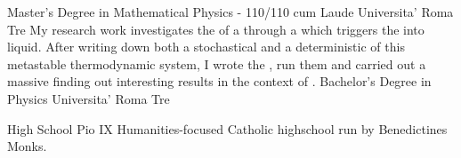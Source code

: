 \documentclass[9pt]{developercv} %
\newcommand{\myHilight}[2]{\tcbtp{\textit{\color{#1}{#2}}}}
\begin{document}



\begin{entrylist}
	\entry
		{}
		{Master's Degree in Mathematical Physics - 110/110 cum Laude}
		{Universita' Roma Tre}
		{My research work investigates the \myHilight{textcolor}{relaxation to the equilibrium} of a 
        \myHilight{textcolor}{supersaturated gas} through a \myHilight{textcolor}{critical droplet} 
        which triggers the \myHilight{textcolor}{phase transition} into liquid.
        \newline 
        After writing down both a stochastical and a deterministic \myHilight{textcolor}{mathematical model} 
        of this metastable thermodynamic system, 
        I wrote the \myHilight{textcolor}{C++ simulations}, run them and carried out a massive \myHilight{textcolor}{data analysis in Python} 
        finding out interesting results in the context of \myHilight{textcolor}{Non-Equilibrium Statistical Mechanics}.}
	\entry
		{}
		{Bachelor's Degree in Physics}
		{Universita' Roma Tre}

	\entry
		{}
		{High School}
		{Pio IX}
		{Humanities-focused Catholic highschool run by Benedictines Monks.}
\end{entrylist}

\end{document}
